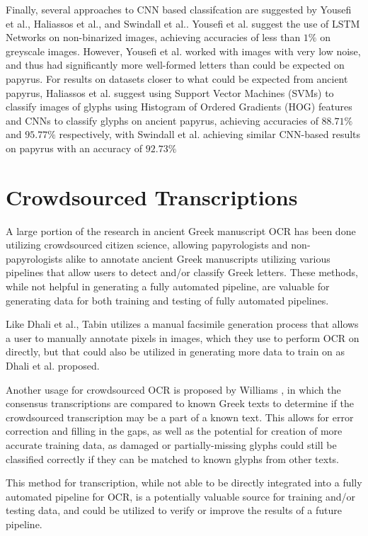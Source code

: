 Finally, several approaches to CNN based classifcation are suggested by Yousefi et al.\cite{Yousefi}, Haliassos et al.\cite{Haliassos}, and Swindall et al.\cite{Swindall}. Yousefi et al. suggest the use of LSTM Networks on non-binarized images, achieving accuracies of less than $1\%$ on greyscale images. However, Yousefi et al. worked with images with very low noise, and thus had significantly more well-formed letters than could be expected on papyrus. For results on datasets closer to what could be expected from ancient papyrus, Haliassos et al.\cite{Haliassos} suggest using Support Vector Machines (SVMs) to classify images of glyphs using Histogram of Ordered Gradients (HOG) features and CNNs to classify glyphs on ancient papyrus, achieving accuracies of $88.71\%$ and $95.77\%$ respectively, with Swindall et al.\cite{Swindall} achieving similar CNN-based results on papyrus with an accuracy of $92.73\%$

\section{Crowdsourced Transcriptions}
A large portion of the research in ancient Greek manuscript OCR has been done utilizing crowdsourced citizen science, allowing papyrologists and non-papyrologists alike to annotate ancient Greek manuscripts utilizing various pipelines that allow users to detect and/or classify Greek letters.\cite{Williams2014, Williams2015, Tabin, Atanasiu} These methods, while not helpful in generating a fully automated pipeline, are valuable for generating data for both training and testing of fully automated pipelines.

Like Dhali et al.\cite{Dhali2019}, Tabin\cite{Tabin} utilizes a manual facsimile generation process that allows a user to manually annotate pixels in images, which they use to perform OCR on directly, but that could also be utilized in generating more data to train on as Dhali et al.\cite{Dhali2019} proposed.

Another usage for crowdsourced OCR is proposed by Williams \cite{Williams2014}, in which the consensus transcriptions are compared to known Greek texts to determine if the crowdsourced transcription may be a part of a known text. This allows for error correction and filling in the gaps, as well as the potential for creation of more accurate training data, as damaged or partially-missing glyphs could still be classified correctly if they can be matched to known glyphs from other texts.

This method for transcription, while not able to be directly integrated into a fully automated pipeline for OCR, is a potentially valuable source for training and/or testing data, and could be utilized to verify or improve the results of a future pipeline.
